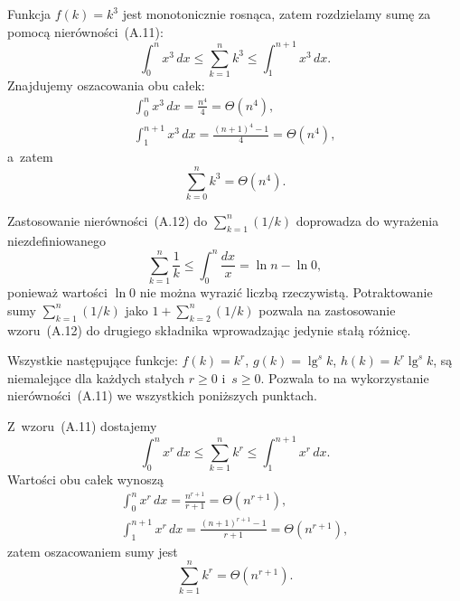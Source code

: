 \exercise{} %
\noindent Funkcja $f(k)=k^3$ jest monotonicznie rosnąca, zatem rozdzielamy sumę za pomocą nierówności~(A.11):
\[
	\int_0^nx^3\,dx \le \sum_{k=1}^nk^3 \le \int_1^{n+1}x^3\,dx.
\]
Znajdujemy oszacowania obu całek:
\begin{gather*}
	\int_0^nx^3\,dx = \frac{n^4}{4} = \Theta(n^4), \\[2mm]
	\int_1^{n+1}x^3\,dx = \frac{(n+1)^4-1}{4} = \Theta(n^4),
\end{gather*}
a~zatem
\[
	\sum_{k=0}^nk^3 = \Theta(n^4).
\]

\exercise{} %
\noindent Zastosowanie nierówności~(A.12) do $\sum_{k=1}^n(1/k)$ doprowadza do wyrażenia niezdefiniowanego
\[
	\sum_{k=1}^n\frac{1}{k} \le \int_0^n\frac{dx}{x} = \ln n-\ln 0,
\]
ponieważ wartości $\ln0$ nie można wyrazić liczbą rzeczywistą. Potraktowanie sumy $\sum_{k=1}^n(1/k)$ jako $1+\sum_{k=2}^n(1/k)$ pozwala na zastosowanie wzoru~(A.12) do drugiego składnika wprowadzając jedynie stałą różnicę.

\problems

\noindent Wszystkie następujące funkcje: $f(k)=k^r$, $g(k)=\lg^sk$, $h(k)=k^r\lg^sk$, są niemalejące dla każdych stałych $r\ge0$ i~$s\ge0$. Pozwala to na wykorzystanie nierówności~(A.11) we wszystkich poniższych punktach.

\subexercise{} %
Z~wzoru~(A.11) dostajemy
\[
	\int_0^nx^r\,dx \le \sum_{k=1}^nk^r \le \int_1^{n+1}x^r\,dx.
\]
Wartości obu całek wynoszą
\begin{gather*}
	\int_0^nx^r\,dx = \frac{n^{r+1}}{r+1} = \Theta(n^{r+1}), \\[2mm]
	\int_1^{n+1}x^r\,dx = \frac{(n+1)^{r+1}-1}{r+1} = \Theta(n^{r+1}),
\end{gather*}
zatem oszacowaniem sumy jest
\[
	\sum_{k=1}^nk^r = \Theta(n^{r+1}).
\]

